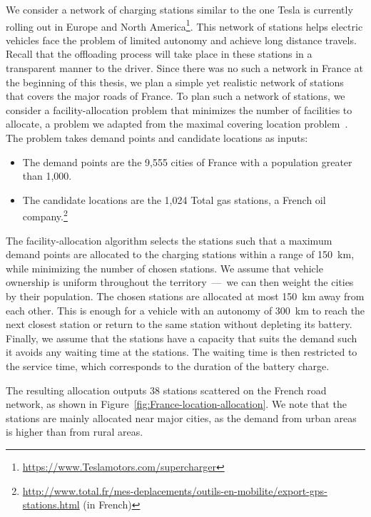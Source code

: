 We consider a network of charging stations similar to the one Tesla is currently rolling out in Europe and North America\footnote{\url{https://www.Teslamotors.com/supercharger}}. This network of stations helps electric vehicles face the problem of limited autonomy and achieve long distance travels. Recall that the offloading process will take place in these stations in a transparent manner to the driver. Since there was no such a network in France at the beginning of this thesis, we plan a simple yet realistic network of stations that covers the major roads of France. To plan such a network of stations, we consider a facility-allocation problem that minimizes the number of facilities to allocate, a problem we adapted from the maximal covering location problem~\cite{church1974maximal}. The problem takes demand points and candidate locations as inputs:
\begin{itemize}

	\item The demand points are the 9,555 cities of France with a population greater than 1,000.
   
	\item The candidate locations are the 1,024 Total gas stations, a French oil company.\footnote{\url{http://www.total.fr/mes-deplacements/outils-en-mobilite/export-gps-stations.html} (in French)}

\end{itemize}

The facility-allocation algorithm selects the stations such that a maximum demand points are allocated to the charging stations within a range of 150~km, while minimizing the number of chosen stations. We assume that vehicle ownership is uniform throughout the territory~---~we can then weight the cities by their population. The chosen stations are allocated at most 150~km away from each other. This is enough for a vehicle with an autonomy of 300~km to reach the next closest station or return to the same station without depleting its battery. Finally, we assume that the stations have a capacity that suits the demand such it avoids any waiting time at the stations. The waiting time is then restricted to the service time, which corresponds to the duration of the battery charge.

The resulting allocation outputs 38 stations scattered on the French road network, as shown in Figure~\ref{fig:France-location-allocation}. We note that the stations are mainly allocated near major cities, as the demand from urban areas is higher than from rural areas.

